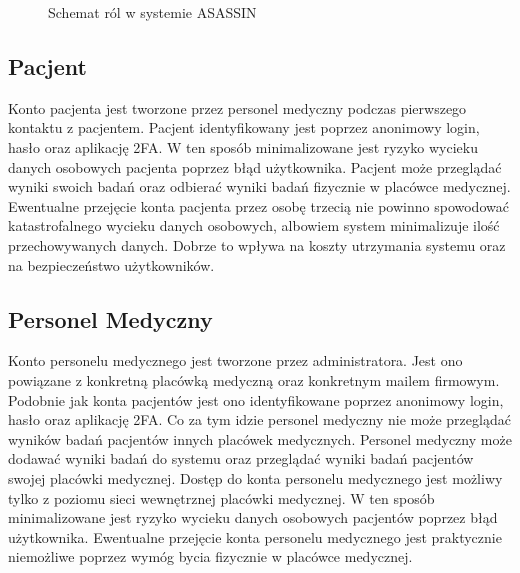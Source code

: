 \documentclass{documentation}
\begin{document}
\begin{figure}[h]
    \centering
    \caption{Schemat ról w systemie ASASSIN\label{fig:roles}}
\end{figure}

\subsection{Pacjent}

Konto pacjenta jest tworzone przez personel medyczny podczas pierwszego kontaktu z pacjentem.
Pacjent identyfikowany jest poprzez anonimowy login, hasło oraz aplikację 2FA.
W ten sposób minimalizowane jest ryzyko wycieku danych osobowych pacjenta poprzez błąd użytkownika.
Pacjent może przeglądać wyniki swoich badań oraz odbierać wyniki badań fizycznie w placówce medycznej.
Ewentualne przejęcie konta pacjenta przez osobę trzecią nie powinno spowodować katastrofalnego wycieku danych osobowych, albowiem system minimalizuje ilość przechowywanych danych.
Dobrze to wpływa na koszty utrzymania systemu oraz na bezpieczeństwo użytkowników.

\subsection{Personel Medyczny}

Konto personelu medycznego jest tworzone przez administratora.
Jest ono powiązane z konkretną placówką medyczną oraz konkretnym mailem firmowym.
Podobnie jak konta pacjentów jest ono identyfikowane poprzez anonimowy login, hasło oraz aplikację 2FA.
Co za tym idzie personel medyczny nie może przeglądać wyników badań pacjentów innych placówek medycznych.
Personel medyczny może dodawać wyniki badań do systemu oraz przeglądać wyniki badań pacjentów swojej placówki medycznej.
Dostęp do konta personelu medycznego jest możliwy tylko z poziomu sieci wewnętrznej placówki medycznej.
W ten sposób minimalizowane jest ryzyko wycieku danych osobowych pacjentów poprzez błąd użytkownika.
Ewentualne przejęcie konta personelu medycznego jest praktycznie niemożliwe poprzez wymóg bycia fizycznie w placówce medycznej.
\end{document}
